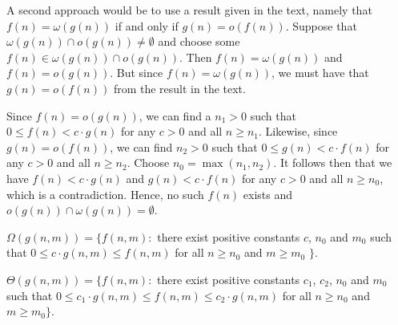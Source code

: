 \documentclass[a4paper,12pt]{article}
\begin{document}
A second approach would be to use a result given in the text, namely that $f(n) = \omega(g(n))$ if and only if $g(n) = o(f(n))$. Suppose that $\omega(g(n)) \cap o(g(n)) \not= \emptyset$ and choose some $f(n) \in \omega(g(n)) \cap o(g(n))$. Then $f(n) = \omega(g(n))$ and $f(n) = o(g(n))$. But since $f(n) = \omega(g(n))$, we must have that $g(n) = o(f(n))$ from the result in the text. 

Since $f(n) = o(g(n))$, we can find a $n_1 > 0$ such that $0 \le f(n) < c \cdot g(n)$ for any $c > 0$ and all $n \ge n_1$. Likewise, since $g(n) = o(f(n))$, we can find $n_2 > 0$ such that $0 \le g(n) < c \cdot f(n)$ for any $c > 0$ and all $n \ge n_2$. Choose $n_0 = \max(n_1, n_2)$. It follows then that we have $f(n) < c\cdot g(n)$ and $g(n) < c\cdot f(n)$ for any $c > 0$ and all $n \ge n_0$, which is a contradiction. Hence, no such $f(n)$ exists and $o(g(n)) \cap \omega(g(n)) = \emptyset$.

\vspace{2mm}

$\Omega(g(n,m)) = \{ f(n,m) : $ there exist positive constants $c$, $n_0$ and $m_0$ such that $0 \le c \cdot g(n,m) \le f(n,m)$ for all $n \ge n_0$ and $m \ge m_0$ $\}$.

$\Theta(g(n,m)) = \{ f(n,m) : $ there exist positive constants $c_1$, $c_2$, $n_0$ and $m_0$ such that $0 \le c_1 \cdot g(n,m) \le f(n,m) \le c_2 \cdot g(n,m)$ for all $n \ge n_0$ and $m \ge m_0$$\}$.
\end{document}
